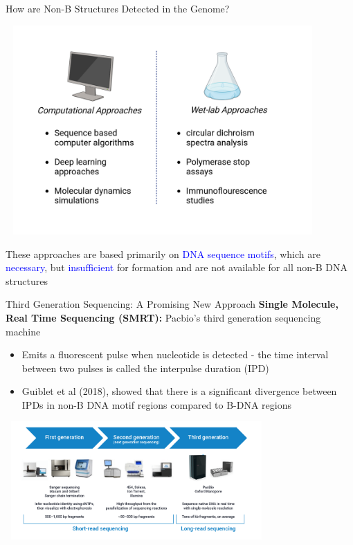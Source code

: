 \documentclass{beamer}
\begin{document}
	\begin{frame}{How are Non-B Structures Detected in the Genome?}
			\begin{center}
				\vspace{-1cm}
				\includegraphics[width=12cm, height=8cm]{Predicting_nonb_structures.png}
				\vspace{-1.5cm}
			\end{center}
		These approaches are based primarily on \textcolor{blue}{DNA sequence motifs}, which are \textcolor{blue}{necessary}, but \textcolor{blue}{insufficient} for formation and are not available for all non-B DNA structures
		
		
	\end{frame}


	\begin{frame}{Third Generation Sequencing: A Promising New Approach}
		\textbf{\color{blue}Single Molecule, Real Time Sequencing (SMRT):} Pacbio's third generation sequencing machine
		\begin{itemize}
			\item Emits a fluorescent pulse when nucleotide is detected - the time interval between two pulses is called the interpulse duration (IPD)
			\item Guiblet et al (2018), showed that there is a significant divergence between IPDs in non-B DNA motif regions compared to B-DNA regions
		\end{itemize}
		
		\centering
		\includegraphics[width=10cm, height=4.5cm]{sequencing_evolution.png}
	\end{frame}
\end{document}
